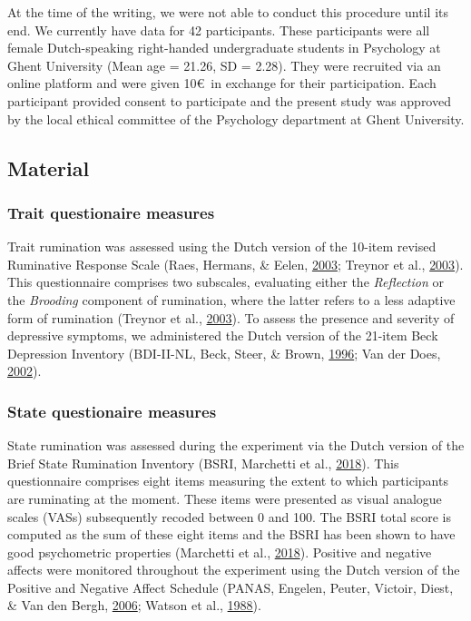 \documentclass[a4paper,12pt,twoside,openright,oldfontcommands]{memoir}
\begin{document}
At the time of the writing, we were not able to conduct this procedure until its end. We currently have data for 42 participants. These participants were all female Dutch-speaking right-handed undergraduate students in Psychology at Ghent University (Mean age = 21.26, SD = 2.28). They were recruited via an online platform and were given 10\euro~in exchange for their participation. Each participant provided consent to participate and the present study was approved by the local ethical committee of the Psychology department at Ghent University.

\hypertarget{material-4}{%
\subsection{Material}\label{material-4}}

\hypertarget{trait-questionaire-measures}{%
\subsubsection{Trait questionaire measures}\label{trait-questionaire-measures}}

Trait rumination was assessed using the Dutch version of the 10-item revised Ruminative Response Scale (Raes, Hermans, \& Eelen, \protect\hyperlink{ref-raes_kort_2003}{2003}; Treynor et al., \protect\hyperlink{ref-treynor_rumination_2003}{2003}). This questionnaire comprises two subscales, evaluating either the \emph{Reflection} or the \emph{Brooding} component of rumination, where the latter refers to a less adaptive form of rumination (Treynor et al., \protect\hyperlink{ref-treynor_rumination_2003}{2003}). To assess the presence and severity of depressive symptoms, we administered the Dutch version of the 21-item Beck Depression Inventory (BDI-II-NL, Beck, Steer, \& Brown, \protect\hyperlink{ref-beck_manual_1996}{1996}; Van der Does, \protect\hyperlink{ref-van_der_does_nederlandse_2002}{2002}).

\hypertarget{state-questionaire-measures}{%
\subsubsection{State questionaire measures}\label{state-questionaire-measures}}

State rumination was assessed during the experiment via the Dutch version of the Brief State Rumination Inventory (BSRI, Marchetti et al., \protect\hyperlink{ref-marchetti_brief_2018}{2018}). This questionnaire comprises eight items measuring the extent to which participants are ruminating at the moment. These items were presented as visual analogue scales (VASs) subsequently recoded between 0 and 100. The BSRI total score is computed as the sum of these eight items and the BSRI has been shown to have good psychometric properties (Marchetti et al., \protect\hyperlink{ref-marchetti_brief_2018}{2018}). Positive and negative affects were monitored throughout the experiment using the Dutch version of the Positive and Negative Affect Schedule (PANAS, Engelen, Peuter, Victoir, Diest, \& Van den Bergh, \protect\hyperlink{ref-engelen_verdere_2006}{2006}; Watson et al., \protect\hyperlink{ref-watson_development_1988}{1988}).
\end{document}
